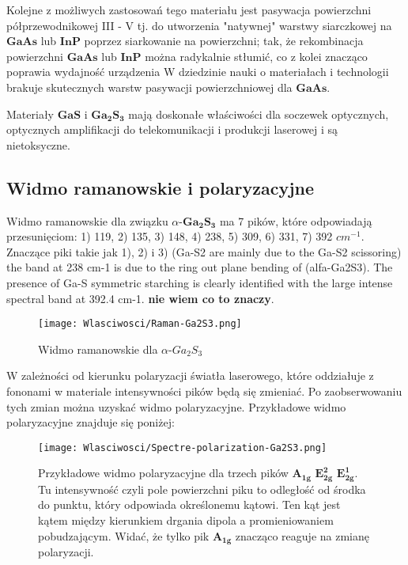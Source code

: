 Kolejne z możliwych zastosowań tego materiału jest pasywacja powierzchni półprzewodnikowej III - V tj. do utworzenia "natywnej" warstwy siarczkowej na $\mathbf{GaAs}$ lub $\mathbf{InP}$ poprzez siarkowanie na powierzchni; tak, że rekombinacja powierzchni $\mathbf{GaAs}$ lub $\mathbf{InP}$ można radykalnie stłumić, co z kolei znacząco poprawia wydajność urządzenia W dziedzinie nauki o materiałach i technologii brakuje skutecznych warstw pasywacji powierzchniowej  dla $\mathbf{GaAs}$.

Materiały $\mathbf{GaS}$ i $\mathbf{Ga_{2}S_{3}}$ mają doskonałe właściwości dla soczewek optycznych, optycznych amplifikacji do telekomunikacji i produkcji laserowej i są nietoksyczne.

\newpage

\subsection{Widmo ramanowskie i polaryzacyjne}

Widmo ramanowskie dla związku $\alpha$-$\mathbf{Ga_{2}S_{3}}$ ma 7 pików, które odpowiadają przesunięciom: 1) 119, 2) 135, 3) 148, 4) 238, 5) 309, 6) 331, 7) 392 $cm^{-1}$. Znaczące piki takie jak 1), 2) i 3) (Ga-S2 are mainly due to the Ga-S2 scissoring) 
the band at 238 cm-1 is due to the ring out plane bending of (alfa-Ga2S3). The presence of Ga-S symmetric starching is clearly identified with the large intense spectral band at 392.4 cm-1. \textbf{nie wiem co to znaczy}.

\begin{figure}[H]
	\begin{center}
		\texttt{[image: Wlasciwosci/Raman-Ga2S3.png]}
		\caption{Widmo ramanowskie dla $\alpha$-$Ga_{2}S_{3}$}
	\end{center}
\end{figure}

W zależności od kierunku polaryzacji światła laserowego, które oddziałuje z fononami w materiale intensywności pików będą się zmieniać. Po zaobserwowaniu tych zmian można uzyskać widmo polaryzacyjne. Przykładowe widmo polaryzacyjne znajduje się poniżej:
 
\begin{figure}[H]
	\begin{center}
		\texttt{[image: Wlasciwosci/Spectre-polarization-Ga2S3.png]}
		\caption{Przykładowe widmo polaryzacyjne dla trzech pików $\mathbf{A_{1g}}$ $\mathbf{E_{2g}^{2}}$ $\mathbf{E_{2g}^{1}}$. Tu intensywność czyli pole powierzchni piku to odległość od środka do punktu, który odpowiada określonemu kątowi. Ten kąt jest kątem między kierunkiem drgania dipola a promieniowaniem pobudzającym. Widać, że tylko pik $\mathbf{A_{1g}}$ znacząco reaguje na zmianę polaryzacji.}
	\end{center}
\end{figure}

